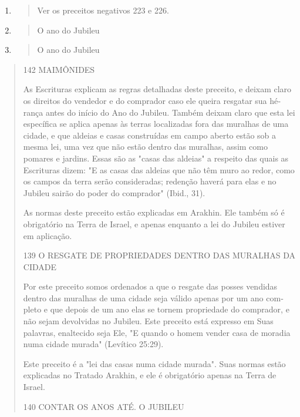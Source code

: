 \begin{enumerate}
\def\labelenumi{\arabic{enumi}.}
\setcounter{enumi}{172}
\item
  \begin{quote}
  Ver os preceitos negativos 223 e 226.
  \end{quote}
\item
  \begin{quote}
  O ano do Jubileu
  \end{quote}
\item
  \begin{quote}
  O ano do Jubileu
  \end{quote}
\end{enumerate}

\begin{quote}
142 MAIMÔNIDES

As Escrituras explicam as regras detalhadas deste preceito, e deixam
claro os direitos do vendedor e do comprador caso ele queira resgatar
sua hé­rança antes do início do Ano do Jubileu. Também deixam claro que
esta lei es­pecífica se aplica apenas às terras localizadas fora das
muralhas de uma cidade, e que aldeias e casas construídas em campo
aberto estão sob a mesma lei, uma vez que não estão dentro das muralhas,
assim como pomares e jardins. Essas são as "casas das aldeias" a
respeito das quais as Escrituras dizem: "E as casas das aldeias que não
têm muro ao redor, como os campos da terra serão consi­deradas; redenção
haverá para elas e no Jubileu sairão do poder do compra­dor" (Ibid.,
31).

As normas deste preceito estão explicadas em Arakhin. Ele também só é
obrigatório na Terra de Israel, e apenas enquanto a lei do Jubileu
estiver em aplicação.

139 O RESGATE DE PROPRIEDADES DENTRO DAS MURALHAS DA CIDADE

Por este preceito somos ordenados a que o resgate das posses ven­didas
dentro das muralhas de uma cidade seja válido apenas por um ano
com­pleto e que depois de um ano elas se tornem propriedade do
comprador, e não sejam devolvidas no Jubileu. Este preceito está
expresso em Suas palavras, enal­tecido seja Ele, "E quando o homem
vender casa de moradia numa cidade mu­rada" (Levítico 25:29).

Este preceito é a "lei das casas numa cidade murada". Suas normas estão
explicadas no Tratado Arakhin, e ele é obrigatório apenas na Terra de
Israel.

140 CONTAR OS ANOS ATÉ. O JUBILEU


\end{quote}
